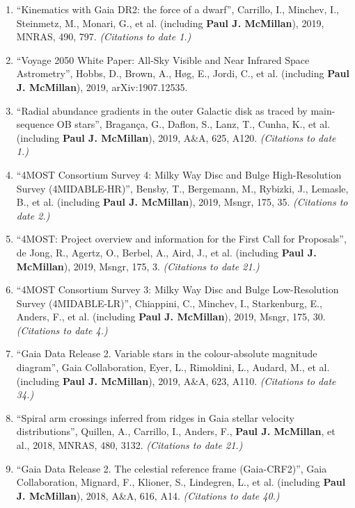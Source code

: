 \documentclass{resume}
\begin{document}
\begin{enumerate}
\item ``Kinematics with Gaia DR2: the force of a dwarf'', Carrillo, I., Minchev, I., Steinmetz, M., Monari, G., et al. (including \textbf{Paul J. McMillan}), 2019, MNRAS, 490, 797. \textit{(Citations to date 1.)}

\item ``Voyage 2050 White Paper: All-Sky Visible and Near Infrared Space Astrometry'', Hobbs, D., Brown, A., H{\o}g, E., Jordi, C., et al. (including \textbf{Paul J. McMillan}), 2019, arXiv:1907.12535.

\item ``Radial abundance gradients in the outer Galactic disk as traced by main-sequence OB stars'', Bragan\c{c}a, G., Daflon, S., Lanz, T., Cunha, K., et al. (including \textbf{Paul J. McMillan}), 2019, A\&A, 625, A120. \textit{(Citations to date 1.)}

\item ``4MOST Consortium Survey 4: Milky Way Disc and Bulge High-Resolution Survey (4MIDABLE-HR)'', Bensby, T., Bergemann, M., Rybizki, J., Lemasle, B., et al. (including \textbf{Paul J. McMillan}), 2019, Msngr, 175, 35. \textit{(Citations to date 2.)}

\item ``4MOST: Project overview and information for the First Call for Proposals'', de Jong, R., Agertz, O., Berbel, A., Aird, J., et al. (including \textbf{Paul J. McMillan}), 2019, Msngr, 175, 3. \textit{(Citations to date 21.)}

\item ``4MOST Consortium Survey 3: Milky Way Disc and Bulge Low-Resolution Survey (4MIDABLE-LR)'', Chiappini, C., Minchev, I., Starkenburg, E., Anders, F., et al. (including \textbf{Paul J. McMillan}), 2019, Msngr, 175, 30. \textit{(Citations to date 4.)}

\item ``Gaia Data Release 2. Variable stars in the colour-absolute magnitude diagram'', Gaia Collaboration, Eyer, L., Rimoldini, L., Audard, M., et al. (including \textbf{Paul J. McMillan}), 2019, A\&A, 623, A110. \textit{(Citations to date 34.)}

\item ``Spiral arm crossings inferred from ridges in Gaia stellar velocity distributions'', Quillen, A., Carrillo, I., Anders, F., \textbf{Paul J. McMillan}, et al., 2018, MNRAS, 480, 3132. \textit{(Citations to date 21.)}

\item ``Gaia Data Release 2. The celestial reference frame (Gaia-CRF2)'', Gaia Collaboration, Mignard, F., Klioner, S., Lindegren, L., et al. (including \textbf{Paul J. McMillan}), 2018, A\&A, 616, A14. \textit{(Citations to date 40.)}


\end{enumerate}
\end{document}
